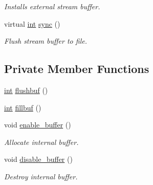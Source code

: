 \begin{DoxyCompactItemize}
\begin{DoxyCompactList}\small\item\em Installs external stream buffer. \end{DoxyCompactList}\item 
virtual \mbox{\hyperlink{ioapi_8h_a787fa3cf048117ba7123753c1e74fcd6}{int}} \mbox{\hyperlink{classgzfilebuf_a8fdf6b079487c0034cb920c63c9eaf55}{sync}} ()
\begin{DoxyCompactList}\small\item\em Flush stream buffer to file. \end{DoxyCompactList}\end{DoxyCompactItemize}
\subsection*{Private Member Functions}
\begin{DoxyCompactItemize}
\item 
\mbox{\hyperlink{ioapi_8h_a787fa3cf048117ba7123753c1e74fcd6}{int}} \mbox{\hyperlink{classgzfilebuf_aa425fda69e0eb2c94231399652491ff0}{flushbuf}} ()
\item 
\mbox{\hyperlink{ioapi_8h_a787fa3cf048117ba7123753c1e74fcd6}{int}} \mbox{\hyperlink{classgzfilebuf_ac8e1bd83de7533320523fa91ad3355d7}{fillbuf}} ()
\item 
void \mbox{\hyperlink{classgzfilebuf_ad2dfb62b88b6d4f03bc268e660ad6712}{enable\+\_\+buffer}} ()
\begin{DoxyCompactList}\small\item\em Allocate internal buffer. \end{DoxyCompactList}\item 
void \mbox{\hyperlink{classgzfilebuf_a8a0be757572b305a44ec3d02dbf8c54c}{disable\+\_\+buffer}} ()
\begin{DoxyCompactList}\small\item\em Destroy internal buffer. \end{DoxyCompactList}\end{DoxyCompactItemize}

